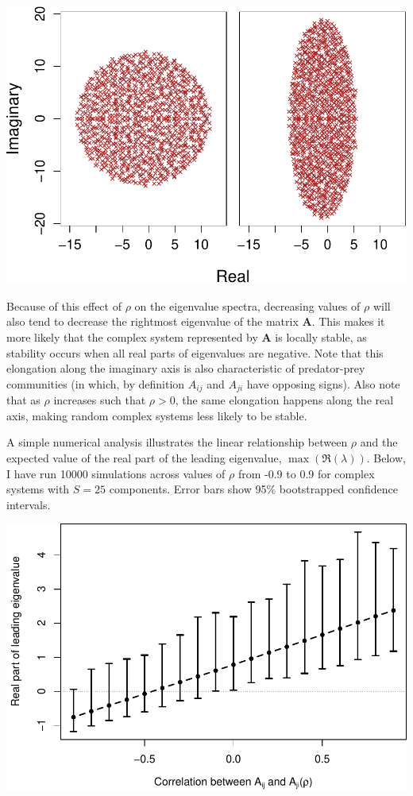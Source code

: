 \documentclass[]{article}
\begin{document}
\includegraphics{revision_notes_files/figure-latex/unnamed-chunk-5-1.pdf}

Because of this effect of \(\rho\) on the eigenvalue spectra, decreasing
values of \(\rho\) will also tend to decrease the rightmost eigenvalue
of the matrix \(\textbf{A}\). This makes it more likely that the complex
system represented by \(\textbf{A}\) is locally stable, as stability
occurs when all real parts of eigenvalues are negative. Note that this
elongation along the imaginary axis is also characteristic of
predator-prey communities (in which, by definition \(A_{ij}\) and
\(A_{ji}\) have opposing signs). Also note that as \(\rho\) increases
such that \(\rho > 0\), the same elongation happens along the real axis,
making random complex systems less likely to be stable.

A simple numerical analysis illustrates the linear relationship between
\(\rho\) and the expected value of the real part of the leading
eigenvalue, \(\max(\Re(\lambda))\). Below, I have run 10000 simulations
across values of \(\rho\) from -0.9 to 0.9 for complex systems with
\(S = 25\) components. Error bars show 95\% bootstrapped confidence
intervals.

\includegraphics{revision_notes_files/figure-latex/unnamed-chunk-7-1.pdf}
\end{document}
